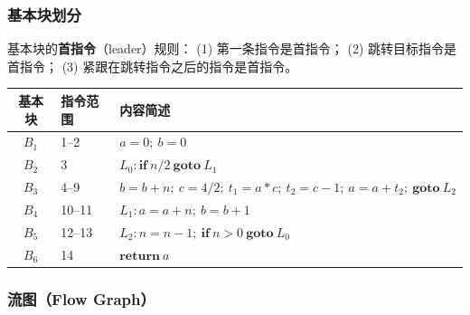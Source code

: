 \documentclass[12pt]{article}
\begin{document}
\subsubsection*{基本块划分}

基本块的\textbf{首指令}（leader）规则：
(1) 第一条指令是首指令；
(2) 跳转目标指令是首指令；
(3) 紧跟在跳转指令之后的指令是首指令。

\begin{center}
\begin{tabular}{cll}
\toprule
\textbf{基本块} & \textbf{指令范围} & \textbf{内容简述} \\
\midrule
$B_1$ & 1--2  & $a = 0;\ b = 0$ \\
$B_2$ & 3     & $L_0\!: \mathbf{if}\ n/2\ \mathbf{goto}\ L_1$ \\
$B_3$ & 4--9  & $b = b + n;\ c = 4/2;\ t_1 = a*c;\ t_2 = c-1;\ a = a+t_2;\ \mathbf{goto}\ L_2$ \\
$B_4$ & 10--11 & $L_1\!: a = a + n;\ b = b + 1$ \\
$B_5$ & 12--13 & $L_2\!: n = n - 1;\ \mathbf{if}\ n > 0\ \mathbf{goto}\ L_0$ \\
$B_6$ & 14    & $\mathbf{return}\ a$ \\
\bottomrule
\end{tabular}
\end{center}

\subsubsection*{流图（Flow Graph）}
\end{document}
